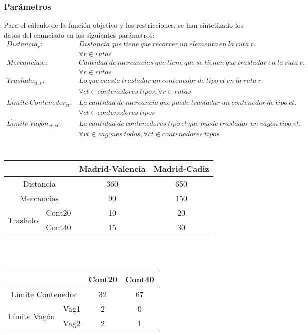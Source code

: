 \documentclass[11pt,spanish]{article}
\begin{document}
			\subsubsection{Parámetros}
			Para el cálculo de la función objetivo y las restricciones, se han sintetizado los datos del enunciado en los siguientes parámetros:
			\begin{align*}
				Distancia_r:& Distancia\ que\ tiene\ que\ recorrer\ un\ elemento\ en\ la\ ruta\ r.\\
				&\forall r \in rutas\\
				Mercancias_r:& Cantidad\ de\ mercancias\ que\ tiene\ que\ se\ tienen\ que\ trasladar\ en\ la\ ruta\ r.\\
				&\forall r \in rutas\\
				Traslado_{ct,r}:& Lo\ que\ cuesta\ trasladar\ un\ contenedor\ de\ tipo\ ct\ en\ la\ ruta\ r.\\
				&\forall ct \in contenedores\ tipos, \forall r \in rutas \\
				L\acute{i}mite\ Contenedor_{ct}:& La\ cantidad\ de\ mercancia\ que\ puede\ trasladar\ un\ contenedor\ de\ tipo\ ct.\\
				&\forall ct \in contenedores\ tipos\\
				L\acute{i}mite\ Vag\acute{o}n_{vt,ct}:& La\ cantidad\ de\ contenedores\ tipo\ ct\ que\ puede\ trasladar\ un\ vag\acute{o}n\ tipo\ vt.\\
				&\forall vt \in vagones\ todos, \forall ct \in contenedores\ tipos\\
			\end{align*}
			\\
			\label{tab:params2rut}
			\begin{tabular}{ |c|c||c|c|  }
				\hline
				\multicolumn{2}{|c||}{}& Madrid-Valencia & Madrid-Cadiz \\
				\hline
				\multicolumn{2}{|c||}{Distancia} & 360 & 650\\
				\multicolumn{2}{|c||}{Mercancias} & 90 & 150\\
				\multirow{2}{*}{Traslado} & Cont20 & 10 & 20\\
				& Cont40 & 15 & 30\\
				\hline
			\end{tabular}
			\\
			\\
			\label{tab:params2cont}
			\begin{tabular}{ |c|c||c|c|  }
				\hline
				\multicolumn{2}{|c||}{}& Cont20 & Cont40 \\
				\hline
				\multicolumn{2}{|c||}{Límite Contenedor} & 32 & 67\\
				\multirow{2}{*}{Límite Vagón} & Vag1 & 2 & 0\\
				& Vag2 & 2 & 1\\
				\hline
			\end{tabular}
\end{document}
